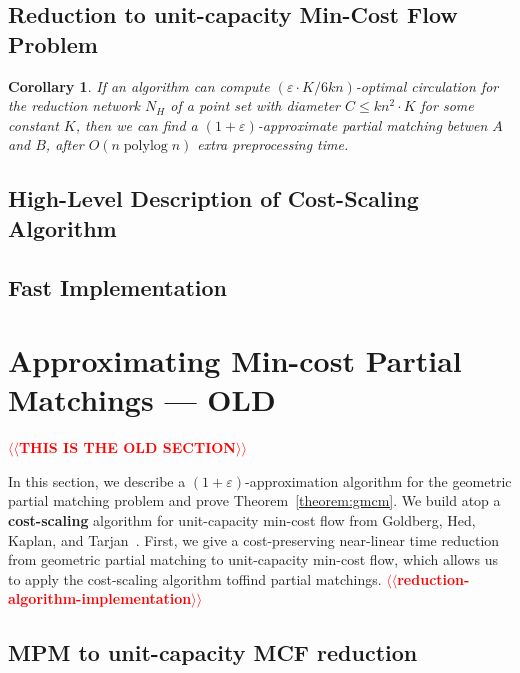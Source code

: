 \documentclass[11pt]{article}
\makeatletter
\def\polylog{\mathop{\mathrm{polylog}}}
\def\eps{\varepsilon}
\theoremstyle{plain}
\newtheorem{corollary}[lemma]{Corollary}
\numberwithin{figure}{section}
\def\EMPH#1{\textbf{\boldmath #1}}
\def\n@te#1{\textsf{\boldmath \textbf{$\langle\!\langle$#1$\rangle\!\rangle$}}\leavevmode}
\def\note#1{\textcolor{red}{\n@te{#1}}}
\makeatother
\begin{document}
\subsection{Reduction to unit-capacity Min-Cost Flow Problem}

\begin{corollary}
If an algorithm can compute $(\eps\cdot K/6kn)$-optimal circulation for the
reduction network $N_H$ of a point set with diameter
$C \leq kn^2 \cdot K$ for some constant $K$, then we can find a $(1+\eps)$-approximate
partial matching betwen $A$ and $B$, after $O(n\polylog n)$ extra preprocessing time.
\end{corollary}

\subsection{High-Level Description of Cost-Scaling Algorithm}

\subsection{Fast Implementation}




\section{Approximating Min-cost Partial Matchings --- OLD}
\label{section:goldberg}

\note{THIS IS THE OLD SECTION}

In this section, we describe a $(1+\eps)$-approximation algorithm for the geometric
partial matching problem and prove Theorem~\ref{theorem:gmcm}.
We build atop a \EMPH{cost-scaling} algorithm for unit-capacity min-cost flow
from Goldberg, Hed, Kaplan, and Tarjan~\cite{GHKT17}.
First, we give a cost-preserving near-linear time reduction from geometric
partial matching to unit-capacity min-cost flow, which allows us to apply the
cost-scaling algorithm toffind partial matchings.
\note{reduction-algorithm-implementation}


\subsection{MPM to unit-capacity MCF reduction}
\label{subsection:mcm_mcf_reduction}
\end{document}
